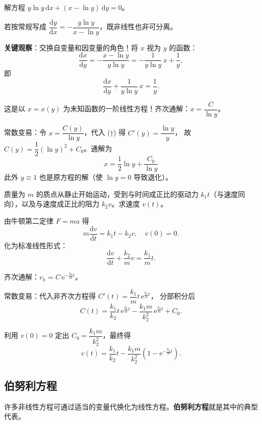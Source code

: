 \documentclass[lang=cn,11pt]{elegantbook}
\begin{document}
\begin{exercise}
解方程 $y\ln y\,\mathrm{d}x+(x-\ln y)\,\mathrm{d}y=0$。
\end{exercise}
\begin{solution}
若按常规写成 $\dfrac{\mathrm{d}y}{\mathrm{d}x}=-\dfrac{y\ln y}{x-\ln y}$，既非线性也非可分离。

\textbf{关键观察}：交换自变量和因变量的角色！将 $x$ 视为 $y$ 的函数：
\[
\frac{\mathrm{d}x}{\mathrm{d}y}=-\frac{x-\ln y}{y\ln y}
=-\frac{1}{y\ln y}\,x+\frac{1}{y},
\]
即
\[
\frac{\mathrm{d}x}{\mathrm{d}y}+\frac{1}{y\ln y}\,x=\frac{1}{y}. \tag{$\dagger$}
\]

这是以 $x=x(y)$ 为未知函数的一阶线性方程！齐次通解：$x=\dfrac{C}{\ln y}$。

常数变易：令 $x=\dfrac{C(y)}{\ln y}$，代入 ($\dagger$) 得 $C'(y)=\dfrac{\ln y}{y}$，
故 $C(y)=\dfrac{1}{2}(\ln y)^{2}+C_0$。通解为
\[
\boxed{x=\frac{1}{2}\ln y+\frac{C_0}{\ln y}}
\]
此外 $y\equiv 1$ 也是原方程的解（使 $\ln y=0$ 导致退化）。
\end{solution}

\begin{exercise}[质点在驱动力与阻力下的运动]
质量为 $m$ 的质点从静止开始运动，受到与时间成正比的驱动力 $k_1 t$（与速度同向），以及与速度成正比的阻力 $k_2 v$。求速度 $v(t)$。
\end{exercise}
\begin{solution}
由牛顿第二定律 $F=ma$ 得
\[
m\frac{\mathrm{d}v}{\mathrm{d}t}=k_1t-k_2v,\quad v(0)=0.
\]
化为标准线性形式：
\[
\frac{\mathrm{d}v}{\mathrm{d}t}+\frac{k_2}{m}v=\frac{k_1}{m}t.
\]

齐次通解：$v_h=C\,\mathrm{e}^{-\frac{k_2}{m}t}$。

常数变易：代入非齐次方程得
$C'(t)=\dfrac{k_1}{m}t\,\mathrm{e}^{\frac{k_2}{m}t}$，
分部积分后
\[
C(t)=\frac{k_1}{k_2}t\,\mathrm{e}^{\frac{k_2}{m}t}-\frac{k_1m}{k_2^{2}}\,\mathrm{e}^{\frac{k_2}{m}t}+C_0.
\]

利用 $v(0)=0$ 定出 $C_0=\dfrac{k_1m}{k_2^{2}}$，最终得
\[
\boxed{v(t)=\frac{k_1}{k_2}t-\frac{k_1m}{k_2^{2}}\!\left(1-\mathrm{e}^{-\frac{k_2}{m}t}\right)}.
\]
\end{solution}

\subsection{伯努利方程}

许多非线性方程可通过适当的变量代换化为线性方程。\textbf{伯努利方程}就是其中的典型代表。
\end{document}
